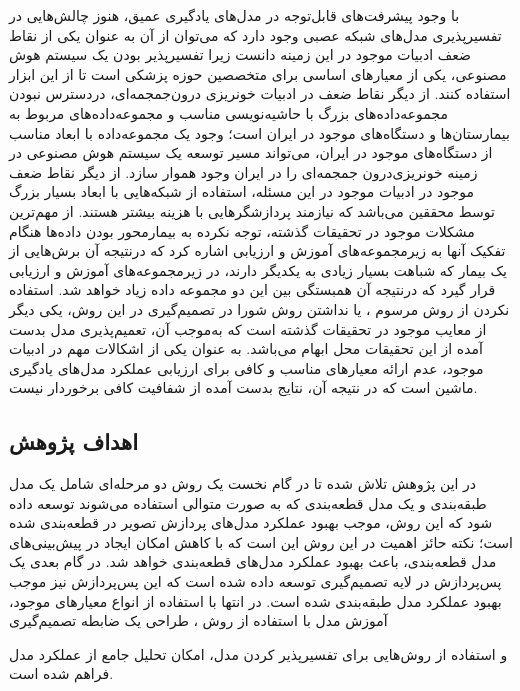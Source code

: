  
 
 
 با وجود پیشرفت‌های قابل‌توجه در مدل‌های یادگیری عمیق، هنوز چالش‌هایی در تفسیرپذیری مدل‌های شبکه عصبی وجود دارد که می‌توان از آن به عنوان یکی از نقاط ضعف ادبیات موجود در این زمینه دانست زیرا تفسیرپذیر بودن یک سیستم هوش مصنوعی، یکی از معیارهای اساسی برای متخصصین حوزه پزشکی است تا از این ابزار استفاده کنند. از دیگر نقاط ضعف در ادبیات خونریزی درون‌جمجمه‌ای، دردسترس نبودن مجموعه‌داده‌های بزرگ با حاشیه‌نویسی مناسب و مجموعه‌داده‌های مربوط به بیمارستان‌ها و دستگاه‌های موجود در ایران است؛ وجود یک مجموعه‌داده با ابعاد مناسب از دستگاه‌های موجود در ایران، می‌تواند مسیر توسعه یک سیستم هوش مصنوعی در زمینه خونریزی‌درون جمجمه‌ای را در ایران وجود هموار سازد. از دیگر نقاط ضعف موجود در ادبیات موجود در این مسئله، استفاده از شبکه‌هایی با ابعاد بسیار بزرگ توسط محققین می‌باشد که نیازمند پردازشگر‌هایی با هزینه بیشتر هستند. از مهم‌ترین مشکلات موجود در تحقیقات گذشته، توجه نکرده به بیمارمحور بودن داده‌ها هنگام تفکیک آنها به زیرمجموعه‌های آموزش و ارزیابی اشاره کرد که درنتیجه‌ آن برش‌هایی از یک بیمار که شباهت بسیار زیادی به یکدیگر دارند، در زیرمجموعه‌های آموزش و ارزیابی قرار گیرد که درنتیجه آن همبستگی بین این دو مجموعه داده زیاد خواهد شد.
استفاده نکردن از روش مرسوم
، 
یا نداشتن روش شورا در تصمیم‌گیری در این روش، یکی دیگر از معایب موجود در تحقیقات گذشته است که به‌موجب آن، تعمیم‌پذیری مدل بدست آمده از این تحقیقات محل ابهام می‌باشد.
به عنوان یکی از اشکالات مهم در ادبیات موجود، عدم ارائه معیارهای مناسب و کافی برای ارزیابی عملکرد مدل‌های یادگیری ماشین است که در نتیجه آن، نتایج بدست آمده از شفافیت کافی برخوردار نیست.
 \subsection{اهداف پژوهش}
 در این پژوهش تلاش شده تا در گام نخست یک روش دو مرحله‌ای شامل یک مدل طبقه‌بندی و یک مدل قطعه‌بندی که به صورت متوالی استفاده می‌شوند توسعه داده شود که این روش،  موجب بهبود عملکرد مدل‌های پردازش تصویر در قطعه‌بندی شده است؛ نکته حائز اهمیت در این روش این است که با کاهش امکان ایجاد 
 در پیش‌بینی‌های مدل قطعه‌بندی، باعث بهبود عملکرد مدل‌های قطعه‌بندی خواهد شد.
  در گام بعدی یک پس‌پردازش
  در لایه تصمیم‌گیری توسعه داده شده است که این پس‌پردازش نیز موجب بهبود عملکرد مدل طبقه‌بندی شده است.
 در انتها با استفاده از انواع معیارهای موجود، آموزش مدل با استفاده از روش
 ،
  طراحی یک ضابطه تصمیم‌گیری
 
  و استفاده از روش‌هایی برای تفسیر‌پذیر کردن مدل، امکان تحلیل جامع از عملکرد مدل فراهم شده است.
